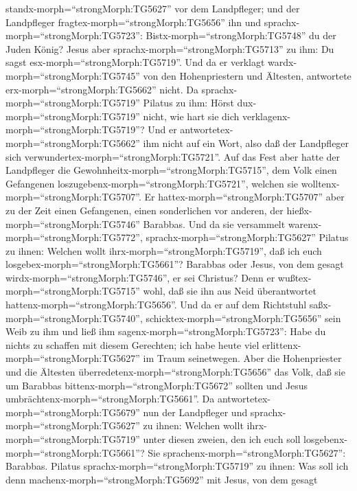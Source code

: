 standx-morph=``strongMorph:TG5627'' vor dem Landpfleger; und der
Landpfleger fragtex-morph=``strongMorph:TG5656'' ihn und
sprachx-morph=``strongMorph:TG5723'': Bistx-morph=``strongMorph:TG5748''
du der Juden König? Jesus aber sprachx-morph=``strongMorph:TG5713'' zu
ihm: Du sagst esx-morph=``strongMorph:TG5719''.  Und da er
verklagt wardx-morph=``strongMorph:TG5745'' von den Hohenpriestern und
Ältesten, antwortete erx-morph=``strongMorph:TG5662'' nicht.
 Da sprachx-morph=``strongMorph:TG5719'' Pilatus zu ihm:
Hörst dux-morph=``strongMorph:TG5719'' nicht, wie hart sie dich
verklagenx-morph=``strongMorph:TG5719''?  Und er
antwortetex-morph=``strongMorph:TG5662'' ihm nicht auf ein Wort, also
daß der Landpfleger sich verwundertex-morph=``strongMorph:TG5721''.
 Auf das Fest aber hatte der Landpfleger die
Gewohnheitx-morph=``strongMorph:TG5715'', dem Volk einen Gefangenen
loszugebenx-morph=``strongMorph:TG5721'', welchen sie
wolltenx-morph=``strongMorph:TG5707''.  Er
hattex-morph=``strongMorph:TG5707'' aber zu der Zeit einen Gefangenen,
einen sonderlichen vor anderen, der hießx-morph=``strongMorph:TG5746''
Barabbas.  Und da sie versammelt
warenx-morph=``strongMorph:TG5772'',
sprachx-morph=``strongMorph:TG5627'' Pilatus zu ihnen: Welchen wollt
ihrx-morph=``strongMorph:TG5719'', daß ich euch
losgebex-morph=``strongMorph:TG5661''? Barabbas oder Jesus, von dem
gesagt wirdx-morph=``strongMorph:TG5746'', er sei Christus?
 Denn er wußtex-morph=``strongMorph:TG5715'' wohl, daß sie
ihn aus Neid überantwortet hattenx-morph=``strongMorph:TG5656''.
 Und da er auf dem Richtstuhl
saßx-morph=``strongMorph:TG5740'',
schicktex-morph=``strongMorph:TG5656'' sein Weib zu ihm und ließ ihm
sagenx-morph=``strongMorph:TG5723'': Habe du nichts zu schaffen mit
diesem Gerechten; ich habe heute viel
erlittenx-morph=``strongMorph:TG5627'' im Traum seinetwegen.
 Aber die Hohenpriester und die Ältesten
überredetenx-morph=``strongMorph:TG5656'' das Volk, daß sie um Barabbas
bittenx-morph=``strongMorph:TG5672'' sollten und Jesus
umbrächtenx-morph=``strongMorph:TG5661''.  Da
antwortetex-morph=``strongMorph:TG5679'' nun der Landpfleger und
sprachx-morph=``strongMorph:TG5627'' zu ihnen: Welchen wollt
ihrx-morph=``strongMorph:TG5719'' unter diesen zweien, den ich euch soll
losgebenx-morph=``strongMorph:TG5661''? Sie
sprachenx-morph=``strongMorph:TG5627'': Barabbas.  Pilatus
sprachx-morph=``strongMorph:TG5719'' zu ihnen: Was soll ich denn
machenx-morph=``strongMorph:TG5692'' mit Jesus, von dem gesagt
